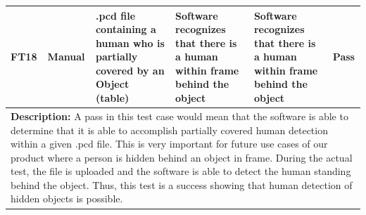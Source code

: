 \documentclass[12pt, titlepage]{article}
\begin{document}
\begin{table}[H]
{\begin{tabular}{|p{1.5cm}|p{2.5cm}|p{3cm}|p{4cm}|p{4cm}|p{1.8cm}|}
      \hline
      FT18 & Manual & \raggedright .pcd file containing a human who is partially covered by an Object (table) & \raggedright Software recognizes that there is a human within frame behind the object & \raggedright Software recognizes that there is a human within frame behind the object & Pass \\
      \hline
      \multicolumn{6}{|p{\textwidth}|}{\raggedright \textbf{Description:} A pass in this test case would mean that the software is able to determine that it is able to accomplish partially covered human detection within a given .pcd file. This is very important for future use cases of our product where a person is hidden behind an object in frame. During the actual test, the file is uploaded and the software is able to detect the human standing behind the object. Thus, this test is a success showing that human detection of hidden objects is possible.} \\
      \hline
    \end{tabular}
    }
  \end{table}
\end{document}
